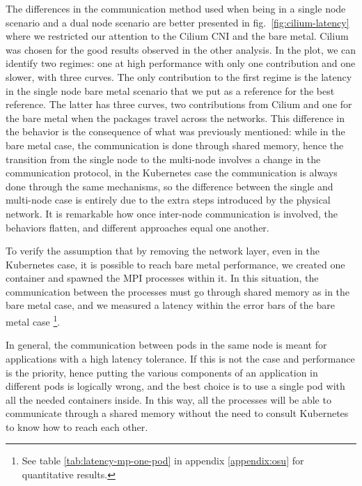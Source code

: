 The differences in the communication method used when being in a single node
scenario and a dual node scenario are better presented in
fig.~\ref{fig:cilium-latency} where we restricted our attention to the Cilium
CNI and the bare metal. Cilium was chosen for the good results observed in the
other analysis. In the plot, we can identify two regimes: one at high
performance with only one contribution and one slower, with three curves. The
only contribution to the first regime is the latency in the single node bare
metal scenario that we put as a reference for the best reference. The latter has
three curves, two contributions from Cilium and one for the bare metal when the
packages travel across the networks. This difference in the behavior is the
consequence of what was previously mentioned: while in the bare metal case, the
communication is done through shared memory, hence the transition from the
single node to the multi-node involves a change in the communication protocol,
in the Kubernetes case the communication is always done through the same
mechanisms, so the difference between the single and multi-node case is entirely
due to the extra steps introduced by the physical network. It is remarkable how
once inter-node communication is involved, the behaviors flatten, and different
approaches equal one another.

To verify the assumption that by removing the network layer, even in the
Kubernetes case, it is possible to reach bare metal performance, we created one
container and spawned the MPI processes within it. In this situation, the
communication between the processes must go through shared memory as in the bare
metal case, and we measured a latency within the error bars of the bare metal
case \footnote{See table \ref{tab:latency-mp-one-pod} in appendix
\ref{appendix:osu} for quantitative results.}.

In general, the communication between pods in the same node is meant for
applications with a high latency tolerance. If this is not the case and
performance is the priority, hence putting the various components of an
application in different pods is logically wrong, and the best choice is to use
a single pod with all the needed containers inside. In this way, all the
processes will be able to communicate through a shared memory without the need
to consult Kubernetes to know how to reach each other.

